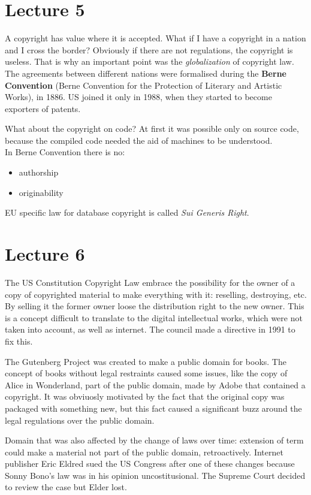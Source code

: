 \documentclass[a4paper, 10pt, titlepage]{article}
\begin{document}
\section{Lecture 5}
A copyright has value where it is accepted. What if I have a copyright in a nation and I cross the border? Obviously if there are not regulations, the copyright is useless. That is why an important point was the \textit{globalization} of copyright law. The agreements between different nations were formalised during the \textbf{Berne Convention} (Berne Convention for the Protection of Literary and Artistic Works), in 1886. US joined it only in 1988, when they started to become exporters of patents.

What about the copyright on code? At first it was possible only on source code, because the compiled code needed the aid of machines to be understood. \medskip \\
In Berne Convention there is no:
\begin{itemize}
\item authorship
\item originability
\end{itemize} \medskip
EU specific law for database copyright is called \textit{Sui Generis Right}.

\section{Lecture 6}
The US Constitution Copyright Law embrace the possibility for the owner of a copy of copyrighted material to make everything with it: reselling, destroying, etc. By selling it the former owner loose the distribution right to the new owner. This is a concept difficult to translate to the digital intellectual works, which were not taken into account, as well as internet. The council made a directive in 1991 to fix this. 

The Gutenberg Project was created to make a public domain for books. The concept of books without legal restraints caused some issues, like the copy of Alice in Wonderland, part of the public domain, made by Adobe that contained a copyright. It was obviuosly motivated by the fact that the original copy was packaged with something new, but this fact caused a significant buzz around the legal regulations over the public domain.

Domain that was also affected by the change of laws over time: extension of term could make a material not part of the public domain, retroactively. Internet publisher Eric Eldred sued the US Congress after one of these changes because Sonny Bono's law was in his opinion uncostitusional. The Supreme Court decided to review the case but Elder lost.
\end{document}
